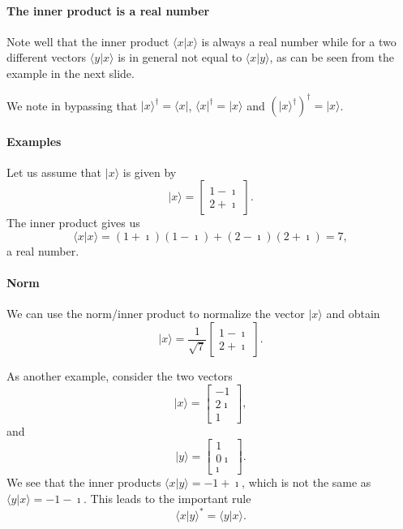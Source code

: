 \paragraph{The inner product is a real number}

\begin{block}{}
Note well that the inner product $\langle x \vert x\rangle$ is always a real number while for a two different vectors $\langle y \vert x\rangle$ is in general not equal to
$\langle x \vert y\rangle$, as can be seen from the example in the next slide. 
\end{block}

\begin{block}{}
We note in bypassing that $\vert x\rangle^{\dagger}=\langle x \vert$,
$\langle x\vert^{\dagger}=\vert x\rangle$ and $(\vert
x\rangle^{\dagger})^{\dagger}=\vert x \rangle$.
\end{block}


\paragraph{Examples}

Let us assume that $\vert x \rangle$ is given by
\[
\vert x \rangle = \begin{bmatrix} 1-\imath \\ 2+\imath \end{bmatrix}.
\]
The inner product gives us
\[
\langle x\vert x \rangle = (1+\imath)(1-\imath)+(2-\imath)(2+\imath)=7,
\]
a real number.


\paragraph{Norm}
We can use the norm/inner product to normalize the vector $\vert x \rangle$ and obtain
\[
\vert x \rangle = \frac{1}{\sqrt{7}}\begin{bmatrix} 1-\imath \\ 2+\imath \end{bmatrix}.
\]

As another example, consider the two vectors
\[
\vert x \rangle = \begin{bmatrix} -1 \\ 2\imath \\ 1\end{bmatrix},
\]
and
\[
\vert y \rangle = \begin{bmatrix} 1 \\ 0\imath \\ \imath\end{bmatrix}.
\]
We see that the inner products $\langle x\vert y \rangle = -1+\imath$, which is not the same as
$\langle y\vert x \rangle = -1-\imath$. This leads to the important rule
\[
\langle x\vert y\rangle^* = \langle y \vert x\rangle. 
\]


